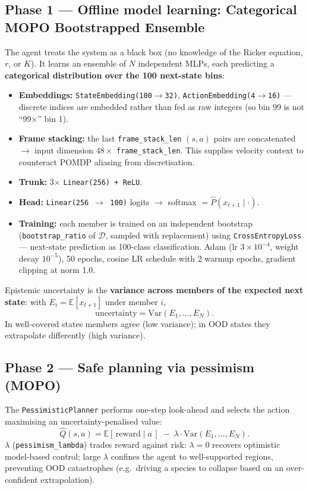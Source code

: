 \documentclass[11pt]{article}
\begin{document}
\subsection{Phase 1 --- Offline model learning: Categorical MOPO Bootstrapped Ensemble}
The agent treats the system as a black box (no knowledge of the Ricker
equation, $r$, or $K$). It learns an ensemble of $N$ independent MLPs, each
predicting a \textbf{categorical distribution over the 100 next-state bins}:
\begin{itemize}
  \item \textbf{Embeddings:} \texttt{StateEmbedding(100$\to$32)},
        \texttt{ActionEmbedding(4$\to$16)} --- discrete indices are embedded
        rather than fed as raw integers (so bin 99 is not ``99$\times$''
        bin 1).
  \item \textbf{Frame stacking:} the last \texttt{frame\_stack\_len}
        $(s,a)$ pairs are concatenated $\rightarrow$ input dimension
        $48 \times$ \texttt{frame\_stack\_len}. This supplies velocity
        context to counteract POMDP aliasing from discretisation.
  \item \textbf{Trunk:} 3$\times$ \texttt{Linear(256) + ReLU}.
  \item \textbf{Head:} \texttt{Linear(256 $\to$ 100)} logits
        $\rightarrow$ softmax $= \hat{P}(x_{t+1}\mid \cdot)$.
  \item \textbf{Training:} each member is trained on an independent
        bootstrap (\texttt{bootstrap\_ratio} of $\mathcal{D}$, sampled with
        replacement) using \texttt{CrossEntropyLoss} --- next-state
        prediction as 100-class classification. Adam (lr
        $3\times10^{-4}$, weight decay $10^{-5}$), 50 epochs, cosine LR
        schedule with 2 warmup epochs, gradient clipping at norm 1.0.
\end{itemize}

Epistemic uncertainty is the \textbf{variance across members of the expected
next state}: with $E_i = \mathbb{E}[x_{t+1}]$ under member $i$,
\begin{equation}
\mathrm{uncertainty} = \mathrm{Var}(E_1,\dots,E_N).
\end{equation}
In well-covered states members agree (low variance); in OOD states they
extrapolate differently (high variance).

\subsection{Phase 2 --- Safe planning via pessimism (MOPO)}
The \texttt{PessimisticPlanner} performs one-step look-ahead and selects the
action maximising an uncertainty-penalised value:
\begin{equation}
\hat{Q}(s,a) = \mathbb{E}[\,\text{reward}\mid a\,]
\;-\; \lambda \cdot \mathrm{Var}(E_1,\dots,E_N).
\end{equation}
$\lambda$ (\texttt{pessimism\_lambda}) trades reward against risk:
$\lambda=0$ recovers optimistic model-based control; large $\lambda$ confines
the agent to well-supported regions, preventing OOD catastrophes (e.g.\
driving a species to collapse based on an over-confident extrapolation).
\end{document}
